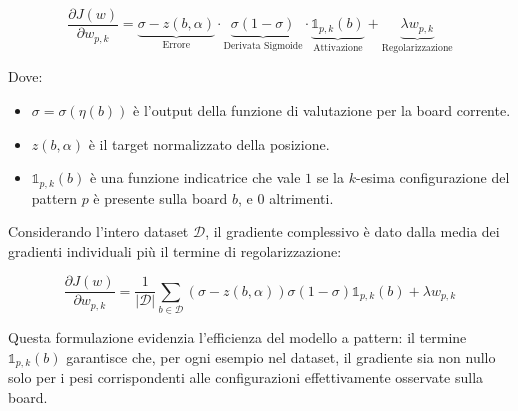 \begin{equation}
    \frac{\partial J(w)}{\partial w_{p,k}} = \underbrace{\sigma - z(b, \alpha)}_{\text{Errore}} \cdot \underbrace{\sigma(1 - \sigma)}_{\text{Derivata Sigmoide}} \cdot \underbrace{\mathbb{1}_{p,k}(b)}_{\text{Attivazione}} + \underbrace{\lambda w_{p,k}}_{\text{Regolarizzazione}}
\end{equation}

Dove:
\begin{itemize}
    \item $\sigma = \sigma(\eta(b))$ è l'output della funzione di valutazione per la board corrente.
    \item $z(b,\alpha)$ è il target normalizzato della posizione.
    \item $\mathbb{1}_{p,k}(b)$ è una funzione indicatrice che vale $1$ se la $k$-esima configurazione del pattern $p$ è presente sulla board $b$, e $0$ altrimenti.
\end{itemize}

Considerando l'intero dataset $\mathcal{D}$, il gradiente complessivo è dato dalla media dei gradienti individuali più il termine di regolarizzazione:

\begin{equation}
    \frac{\partial J(w)}{\partial w_{p,k}} = \frac{1}{|\mathcal{D}|} \sum_{b \in \mathcal{D}} (\sigma - z(b, \alpha)) \sigma(1 - \sigma) \mathbb{1}_{p,k}(b) + \lambda w_{p,k}
\end{equation}

Questa formulazione evidenzia l'efficienza del modello a pattern: il termine $\mathbb{1}_{p,k}(b)$ garantisce che, per ogni esempio nel dataset,
il gradiente sia non nullo solo per i pesi corrispondenti alle configurazioni effettivamente osservate sulla board.
